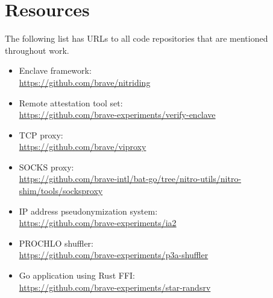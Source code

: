 \section*{Resources}

The following list has URLs to all code repositories that are mentioned
throughout work.

\begin{itemize}
  \item Enclave framework:\\
    {\small \url{https://github.com/brave/nitriding}}

  \item Remote attestation tool set:\\
    {\small \url{https://github.com/brave-experiments/verify-enclave}}

  \item TCP proxy:\\
    {\small \url{https://github.com/brave/viproxy}}

  \item SOCKS proxy:\\
    {\small \url{https://github.com/brave-intl/bat-go/tree/nitro-utils/nitro-shim/tools/socksproxy}}

  \item IP address pseudonymization system:\\
    {\small \url{https://github.com/brave-experiments/ia2}}

  \item PROCHLO shuffler:\\
    {\small \url{https://github.com/brave-experiments/p3a-shuffler}}

  \item Go application using Rust FFI:\\
    {\small \url{https://github.com/brave-experiments/star-randsrv}}

\end{itemize}
